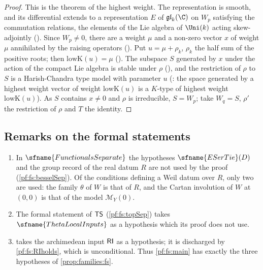 \begin{proof}
This is the theorem of the highest weight. The representation is smooth, and its differential extends to a representation $E$ of
$\mathfrak{gl}_k(\C)$ on $W_p$ satisfying the commutation relations, the elements of the Lie algebra of $\Uni(k)$ acting skew-adjointly
(). Since $W_p\ne0$, there are a weight $\mu$ and a non-zero vector
$x$ of weight $\mu$ annihilated by the raising operators (). Put $u=\mu+\rho_k$, $\rho_k$ the
half sum of the positive roots; then $\mathrm{lowK}(u)=\mu$ (). The subspace $S$ generated by $x$ under
the action of the compact Lie algebra is stable under $\rho$ (), and the restriction
of $\rho$ to $S$ is a Harish-Chandra type model with parameter $u$ (: the space
generated by a highest weight vector of weight $\mathrm{lowK}(u)$ is a $K$-type of highest weight $\mathrm{lowK}(u)$). As $S$ contains $x\ne0$ and
$\rho$ is irreducible, $S=W_p$; take $W_q=S$, $\rho'$ the restriction of $\rho$ and $T$ the identity.
\end{proof}

\subsection{Remarks on the formal statements}\label{sec:pf:fs:remarks}

\begin{remark}\label{pf:fs:rem:unused}
\begin{enumerate}[label=(\alph*)]
\item In $\sfname{FunctionalsSeparate}$ the hypotheses $\sfname{ESerTie}(D)$ and the group record of the real datum $R$ are not used
by the proof (\cref{pf:fs:besselSep}). Of the conditions defining a Weil datum over $R$, only two are used: the family $\theta$ of $W$ is
that of $R$, and the Cartan involution of $W$ at $(0,0)$ is that of the model $\mathcal M_Y(0)$.
\item The formal statement of $\mathsf{TS}$ (\cref{pf:fs:topSep}) takes $\sfname{ThetaLocalInputs}$ as a hypothesis which its proof does not
use.
\item {} takes the archimedean input $\mathsf{RI}$ as a hypothesis; it is discharged by \cref{pf:fs:RIholds}, which is
unconditional. Thus \cref{pf:fs:main} has exactly the three hypotheses of \cref{prop:families:fs}.
\end{enumerate}
\end{remark}

